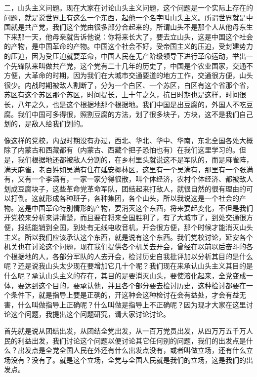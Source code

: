 二，山头主义问题。现在大家在讨论山头主义问题，这个问题是一个实际上存在的问题，就是说世界上有这么一个东西，起他一个名字叫山头主义。所谓世界就是中国就是共产党，我们这个党由很多部分合起来的，所谓山头不是那个人从他母东生下来那一天，他母亲就告诉他说：你将来长大了，要去立山头，这是中国这个社会的产物，是中国革命的产物。中国这个社会不好，受帝国主义的压迫，受封建势力的压迫，因为受压迫就要革命，中国人民在无产阶级领导下进行革命运动，举出一个先锋队来叫做共产党，这个党有二十几年的历史了，中国是个农业国家，交通不方便，大革命的时期，因为我们在大城市交通要道的地方工作，交通很方便，山头很少。内战时期被敌人割断了，分为一个白区、一个苏区，白区有这个省那个省，苏区有这个苏区那个苏区，时间提长，上十年之久，抗日时期也是这样，时间很长，八年之久，也是这个根据地那个根据地。我们中国是出豆腐的，外国人不吃豆腐。我们中国可多得很，照割豆腐的方法，划了很多块子，方块，这不是我们自己划的，是敌人给我们划的。

像这样的党校，内战时期没有办过，西北、华北、华中、华南，东北全国各处大概除了内蒙古和西藏都有（内蒙古、西藏个把子恐怕也有）在我们这里学习的。但是，我们根据地还都被敌人分割的，在乡村里头就说这不是军队的，而是麻雀阵，满天麻雀，老百姓如吴满有住在延安椰林区，这里有一个吴满有，那里有一个张满有，又有一个李满有，一家一家分得很散，叫个体经济，农村个体经济、都被敌人划成豆腐块子，这些革命党革命军队，团结起来打敌人，就很自然的很有理由的可以打倒。这就形成各种班子，各种集团，各个山头，所以我说这是一个社会的产物。这是中国革命特别情形的产物，要消灭这个东西，将来要起变化，不但是我们开党校来分析来讲清楚，而且要在将来全国胜利了，有了大城市了，到处交通很方便，报纸能销到全国，到处有无线电收音机，开会很方便，那个时候才能消灭山头主义。所以我们应该承认这个东西，就是说有这个东西。我们党校讨论，延安各个机关也在讨论这个问题，现在我们提供各个机关去开会，曾经在以前以后奋斗的各个根据地的人，各部分军队的人去开会，检讨历史自我批评加以分析其目的是什么呢？还是说我山头太少现在要增加它几十个呢？我们现在来承认山头主义其目的是什么呢？承认山头主义的存在，其目的是要消灭山头，要使溶化起来，全党变成一体，要达到这个目的，要承认他，并且各个部分要去检讨历史，这种检讨都要在一个条件下，就是指导上要是正确的，开这种会这种检讨在会有益处，才会有益无害，什么叫做指导上正确呢？什么叫做是指导上不正确呢？因为现才大家在这里讨论这个问题，我提出这个问题研究，请大家讨论讨论。

首先就是说从团结出发，从团结全党出发，从一百万党员出发，从四万万五千万人民的利益出发，我们讨论这个问题以便讨论其它任何别的问题，我们的出发点是什么？出发点是全党全国人民在外还有什么出发点没有，或者叫做立场，还有什么立场没有？没有了。就是这个立场，全党与全国人民就是我们的立场，这是我们的出发点。

